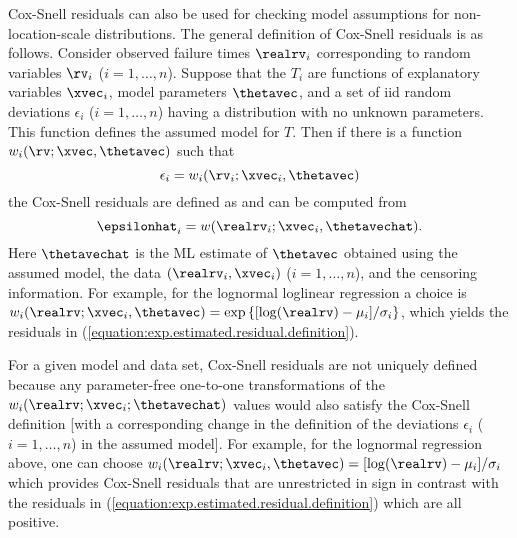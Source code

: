 Cox-Snell residuals can also be used for checking model assumptions
for non-location-scale distributions. The general definition of
Cox-Snell residuals is as follows.  Consider observed failure times
$\realrv_{i}$ corresponding to random variables $\rv_{i}$
($i=1,\dots,n$). Suppose that the $T_{i}$ are
functions of explanatory variables $\xvec_{i}$, model parameters
$\thetavec$, and a set of iid random deviations $\epsilon_{i}$ ($i=1,\dots, n$)
having a distribution with no unknown parameters. This function
defines the assumed model for $T$. Then if there is a function
$w_{i}(\rv;
\xvec,\thetavec)$ such that
\begin{displaymath}
\epsilon_{i} = w_{i}(\rv_{i}; \xvec_{i},\thetavec)
\end{displaymath}
the Cox-Snell residuals are defined as and can be computed from
\begin{displaymath}
\epsilonhat_{i}= w(\realrv_{i}; \xvec_{i},\thetavechat).
\end{displaymath}
Here $\thetavechat$ is the ML estimate of $\thetavec$
obtained using the assumed model, 
the data $(\realrv_{i}, \xvec_{i})$ ($i=1,\dots,n$), 
and the censoring information.
For example, for the lognormal loglinear regression
a choice is 
$w_{i}(\realrv;\xvec_{i}, \thetavec)=
\exp \left \{[\log(\realrv)-\mu_{i}]/\sigma_{i}\right \}$,
which yields the residuals in
(\ref{equation:exp.estimated.residual.definition}).

For a given model and data set, Cox-Snell residuals are not uniquely
defined because any parameter-free one-to-one transformations of the
$w_{i}(\realrv; \xvec_{i}; \thetavechat)$ values would also satisfy
the Cox-Snell definition [with a corresponding change in the
definition of the deviations $\epsilon_{i}$ ($i=1,\dots, n$) in the
assumed model].  For example, for the lognormal regression above,
one can choose $w_{i}(\realrv;\xvec_{i},
\thetavec)= [\log(\realrv)-\mu_{i}]/\sigma_{i}$ which provides
Cox-Snell residuals that are unrestricted in sign in contrast with
the residuals in (\ref{equation:exp.estimated.residual.definition})
which are all positive.

